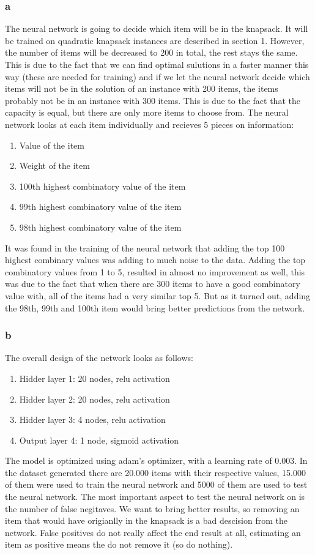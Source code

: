 \subsubsection*{a}
The neural network is going to decide which item will be in the knapsack. It will be trained on quadratic knapsack instances are described in section 1. However, the number of items will be decreased to 200 in total, the rest stays the same. This is due to the fact that we can find optimal sulutions in a faster manner this way (these are needed for training) and if we let the neural network decide which items will not be in the solution of an instance with 200 items, the items probably not be in an instance with 300 items. This is due to the fact that the capacity is equal, but there are only more items to choose from. The neural network looks at each item individually and recieves 5 pieces on information: 
\begin{enumerate}
	\item Value of the item
	\item Weight of the item
	\item 100th highest combinatory value of the item
	\item 99th highest combinatory value of the item
	\item 98th highest combinatory value of the item
\end{enumerate}
It was found in the training of the neural network that adding the top 100 highest combinary values was adding to much noise to the data. Adding the top combinatory values from 1 to 5, resulted in almost no improvement as well, this was due to the fact that when there are 300 items to have a good combinatory value with, all of the items had a very similar top 5. But as it turned out, adding the 98th, 99th and 100th item would bring better predictions from the network. 
\subsubsection*{b}
The overall design of the network looks as follows:
\begin{enumerate}
	\item Hidder layer 1: 20 nodes, relu activation
	\item Hidder layer 2: 20 nodes, relu activation
	\item Hidder layer 3: 4 nodes, relu activation
	\item Output layer 4: 1 node, sigmoid activation
\end{enumerate}
The model is optimized using adam's optimizer, with a learning rate of 0.003. In the dataset generated there are 20.000 items with their respective values, 15.000 of them were used to train the neural network and 5000 of them are used to test the neural network. The most important aspect to test the neural network on is the number of false negitaves. We want to bring better results, so removing an item that would have origianlly in the knapsack is a bad descision from the network. False positives do not really affect the end result at all, estimating an item as positive means the do not remove it (so do nothing).
